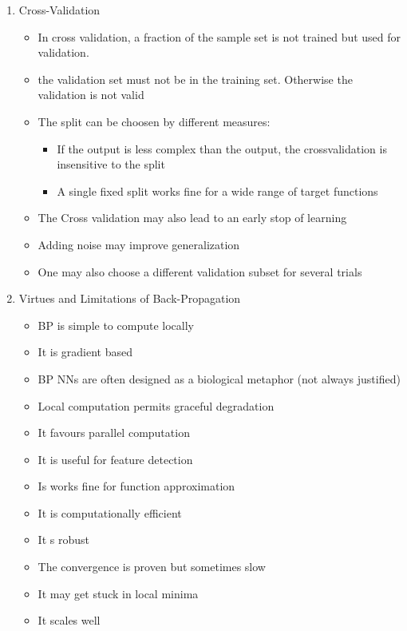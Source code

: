 \documentclass{scrartcl}
\begin{document}
\begin{enumerate}
\item Cross-Validation
	\begin{itemize}
	\item In cross validation, a fraction of the sample set is not trained but used for validation.
	\item the validation set must not be in the training set. Otherwise the validation is not valid
	\item The split can be choosen by different measures:
		\begin{itemize}
		\item If the output is less complex than the output, the crossvalidation is insensitive to the split
		\item A single fixed split works fine for a wide range of target functions
		\end{itemize}
	\item The Cross validation may also lead to an early stop of learning
	\item Adding noise may improve generalization
	\item One may also choose a different validation subset for several trials
	\end{itemize}

\addtocounter{enumi}{1}
\item Virtues and Limitations of Back-Propagation
	\begin{itemize}
	\item BP is simple to compute locally
	\item It is gradient based
	\item BP NNs are often designed as a biological metaphor (not always justified)
	\item Local computation permits graceful degradation
	\item It favours parallel computation
	\item It is useful for feature detection
	\item Is works fine for function approximation
	\item It is computationally efficient
	\item It s robust
	\item The convergence is proven but sometimes slow
	\item It may get stuck in local minima
	\item It scales well
	\end{itemize}
	

\end{enumerate}
\end{document}

